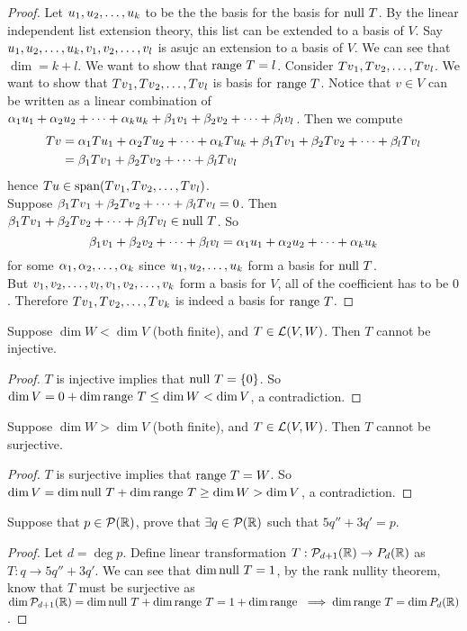 \begin{proof}
    Let ${u}_1,{u}_2, \ldots, {u}_{k}$ to be the the basis for the basis for $\text{null } T$. By the linear independent list extension theory, this list can be extended to a basis of $V$. Say ${  u}_1,{  u}_2, \ldots, {  u}_{k}, {  v}_1,{  v}_2, \ldots, {  v}_{l}$ is asujc an extension to a basis of $V$. We can see that $\dim = k + l$. We want to show that $\text{range } T = l$. Consider ${T  v}_1,{T  v}_2, \ldots, {T  v}_{l}$. We want to show that ${T  v}_1,{T  v}_2, \ldots, {T  v}_{l}$ is basis for $\text{range } T$. Notice that $  v \in V$ can be written as a linear combination of ${\alpha}_1{  u}_1 + {\alpha}_2{  u}_2 + \cdots + {\alpha}_{k}{  u}_{k} + {\beta}_1{  v}_1 + {\beta}_2{  v}_2 + \cdots + {\beta}_{l}{  v}_{l}$. Then we compute \begin{align*}T  v &= {\alpha}_1{T  u}_1 + {\alpha}_2{T  u}_2 + \cdots + {\alpha}_{k}{T  u}_{k} + {\beta}_1{T  v}_1 + {\beta}_2{T  v}_2 + \cdots + {\beta}_{l}{T  v}_{l} \\ &= {\beta}_1{T  v}_1 + {\beta}_2{T  v}_2 + \cdots + {\beta}_{l}{T  v}_{l} \end{align*} hence $T  u \in \text{span} ({T  v}_1,{T  v}_2, \ldots, {T  v}_{l})$. \\
    Suppose ${\beta}_1{T  v}_1 + {\beta}_2{T  v}_2 + \cdots + {\beta}_{l}{T  v}_{l} = 0$. Then ${\beta}_1{T  v}_1 + {\beta}_2{T  v}_2 + \cdots + {\beta}_{l}{T  v}_{l} \in \text{null } T$. So \[{\beta}_1{v}_1 + {\beta}_2{v}_2 + \cdots + {\beta}_{l}{v}_{l} = {\alpha}_1{u}_1 + {\alpha}_2{u}_2 + \cdots + {\alpha}_{k}{u}_{k}\] for some ${\alpha}_1,{\alpha}_2, \ldots, {\alpha}_{k}$ since ${u}_1,{u}_2, \ldots, {u}_{k}$ form a basis for $\text{null } T$. \\
    But ${v}_1,{v}_2, \ldots, {v}_{l}, {v}_1,{v}_2, \ldots, {v}_{k}$ form a basis for $V$, all of the coefficient has to be $0$. Therefore ${Tv}_1,{Tv}_2, \ldots, {Tv}_{k}$ is indeed a basis for $\text{range } T$.
\end{proof}
\begin{example}
    Suppose $\dim W < \dim V$ (both finite), and $T \in \mathcal L(V,W)$. Then $T$  cannot be injective.
\end{example}
\begin{proof}
    $T$ is injective implies that $\text{null } T = \left\{ 0 \right\}$. So $\dim V = 0 + \dim \text{range } T \leq \dim W < \dim V$, a contradiction. 
\end{proof}
\begin{example}
    Suppose $\dim W > \dim V$ (both finite), and $T \in \mathcal L(V,W)$. Then $T$  cannot be surjective.
\end{example}
\begin{proof}
    $T$ is surjective implies that $\text{range } T = W$. So $\dim V = \dim \text{null } T + \dim \text{range } T \geq \dim W > \dim V$, a contradiction. 
\end{proof}
\begin{example}
    Suppose that $p \in \mathcal P(\mathbb R)$, prove that $\exists q \in \mathcal P(\mathbb R)$ such that $5q'' + 3q' = p$. \\
\end{example}
\begin{proof}
    Let $d = \deg p$. Define linear transformation $T: \mathcal P_{d +1}(\mathbb R) \to P_d(\mathbb R)$ as $T: q \to 5q''  +3q'$. We can see that $\dim \text{null } T  = 1$, by the rank nullity theorem, know that $T$ must be surjective as $\dim \mathcal P_{d+1}(\mathbb R) = \dim \text{null } T + \dim \text{range } T = 1 + \dim \text{range } \implies \dim \text{range } T = \dim P_d(\mathbb R)$.
\end{proof}
